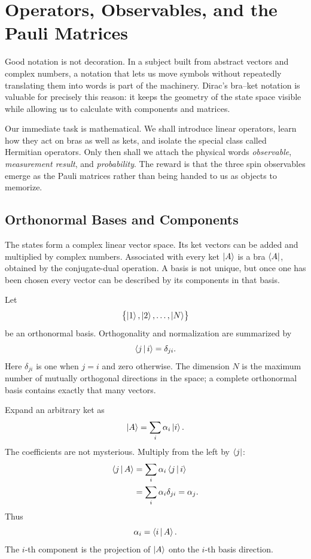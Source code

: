 \chapter{Operators, Observables, and the Pauli Matrices}

Good notation is not decoration. In a subject built from abstract vectors and complex numbers, a notation that lets us move symbols without repeatedly translating them into words is part of the machinery. Dirac's bra--ket notation is valuable for precisely this reason: it keeps the geometry of the state space visible while allowing us to calculate with components and matrices.

Our immediate task is mathematical. We shall introduce linear operators, learn how they act on bras as well as kets, and isolate the special class called Hermitian operators. Only then shall we attach the physical words \emph{observable}, \emph{measurement result}, and \emph{probability}. The reward is that the three spin observables emerge as the Pauli matrices rather than being handed to us as objects to memorize.

\section{Orthonormal Bases and Components}

The states form a complex linear vector space. Its ket vectors can be added and multiplied by complex numbers. Associated with every ket \(\left\lvert A\right\rangle\) is a bra \(\left\langle A\right\rvert\), obtained by the conjugate-dual operation. A basis is not unique, but once one has been chosen every vector can be described by its components in that basis.

Let
\[
\bigl\{\left\lvert1\right\rangle,\left\lvert2\right\rangle,\ldots,\left\lvert N\right\rangle\bigr\}
\]
be an orthonormal basis. Orthogonality and normalization are summarized by
\begin{equation}
\left\langle j\,\middle|\,i\right\rangle=\delta_{ji}.
\label{eq:orthonormal-basis}
\end{equation}
Here \(\delta_{ji}\) is one when \(j=i\) and zero otherwise. The dimension \(N\) is the maximum number of mutually orthogonal directions in the space; a complete orthonormal basis contains exactly that many vectors.

Expand an arbitrary ket as
\begin{equation}
\left\lvert A\right\rangle=\sum_i \alpha_i\left\lvert i\right\rangle.
\label{eq:ket-expansion}
\end{equation}
The coefficients are not mysterious. Multiply from the left by \(\left\langle j\right\rvert\):
\begin{align}
\left\langle j\,\middle|\,A\right\rangle
 &=\sum_i\alpha_i\left\langle j\,\middle|\,i\right\rangle \\
 &=\sum_i\alpha_i\delta_{ji}
 =\alpha_j.
\end{align}
Thus
\begin{equation}
\alpha_i=\left\langle i\,\middle|\,A\right\rangle.
\label{eq:components-inner-products}
\end{equation}
The \(i\)-th component is the projection of \(\left\lvert A\right\rangle\) onto the \(i\)-th basis direction.

